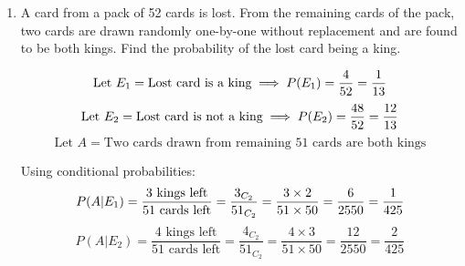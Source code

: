 \begin{enumerate}[label=\thesubsection.\arabic*, ref=\thesubsection.\theenumi]
$$\Delta = (1 + xyz)\mydet{ 1 & x & x^2 \\ 1 & y & y^2 \\ 1 & z & z^2 }$$

Now, apply row operations to evaluate the determinant:
$$
R_2 \to R_2 - R_1 $$
$$R_3 \to R_3 - R_1
$$

$$\Delta = (1 + xyz) \mydet{ 1 & x & x^2 \\ 0 & y-x & y^2-x^2 \\ 0 & z-x & z^2-x^2 }$$

Take $(y-x)$ common from $R_2$ and $(z-x)$ common from $R_3$:
$$\Delta = (1 + xyz)(y - x)(z - x) \mydet{ 1 & x & x^2 \\ 0 & 1 & y+x \\ 0 & 1 & z+x }$$

$$
\Delta = (1 + xyz)(y - x)(z - x) [1 \cdot (z + x - (y + x))] \\$$
$$= (1 + xyz)(y - x)(z - x)(z - y) \\$$
$$= (1 + xyz)(x - y)(y - z)(z - x)
$$

We are given that $\Delta = 0$:
$$(1 + xyz)(x - y)(y - z)(z - x) = 0$$

Since $x, y, z$ are distinct, $(x - y) \neq 0$, $(y - z) \neq 0$, and $(z - x) \neq 0$.

Therefore:
$$1 + xyz = 0$$



\item

A card from a pack of 52 cards is lost. From the remaining cards of the pack, two cards are drawn randomly one-by-one without replacement and are found to be both kings. Find the probability of the lost card being a king.   

\solution 

$$
\text{Let } E_1 = \text{Lost card is a king} \implies P(E_1) = \frac{4}{52} = \frac{1}{13} \\$$
$$\text{Let } E_2 = \text{Lost card is not a king} \implies P(E_2) = \frac{48}{52} = \frac{12}{13} \\$$
$$\text{Let } A = \text{Two cards drawn from remaining 51 cards are both kings}$$


Using conditional probabilities:
$$
P(A | E_1) = \frac{\text{3 kings left}}{\text{51 cards left}} = \frac{3_{C_2}}{51_{C_2}} = \frac{3 \times 2}{51 \times 50} = \frac{6}{2550} = \frac{1}{425} \\$$
$$P(A | E_2) = \frac{\text{4 kings left}}{\text{51 cards left}} = \frac{4_{C_2}}{51_{C_2}} = \frac{4 \times 3}{51 \times 50} = \frac{12}{2550} = \frac{2}{425}$$


\end{enumerate}
